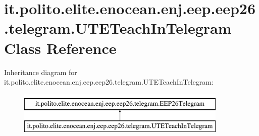 \hypertarget{classit_1_1polito_1_1elite_1_1enocean_1_1enj_1_1eep_1_1eep26_1_1telegram_1_1_u_t_e_teach_in_telegram}{}\section{it.\+polito.\+elite.\+enocean.\+enj.\+eep.\+eep26.\+telegram.\+U\+T\+E\+Teach\+In\+Telegram Class Reference}
\label{classit_1_1polito_1_1elite_1_1enocean_1_1enj_1_1eep_1_1eep26_1_1telegram_1_1_u_t_e_teach_in_telegram}
Inheritance diagram for it.\+polito.\+elite.\+enocean.\+enj.\+eep.\+eep26.\+telegram.\+U\+T\+E\+Teach\+In\+Telegram\+:\begin{figure}[H]
\begin{center}
\leavevmode
\includegraphics[height=2.000000cm]{classit_1_1polito_1_1elite_1_1enocean_1_1enj_1_1eep_1_1eep26_1_1telegram_1_1_u_t_e_teach_in_telegram}
\end{center}
\end{figure}

